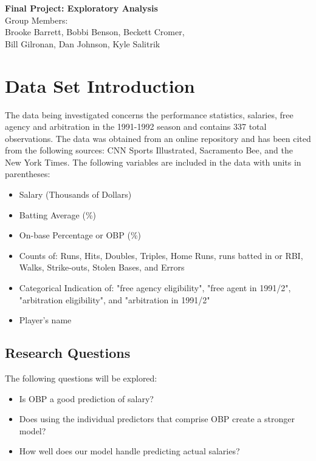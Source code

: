 \documentclass[a4paper, 11pt]{article}
\begin{document}
\graphicspath{{./figures/}}
\noindent
\large\textbf{Final Project: Exploratory Analysis} \\
\normalsize Group Members:\\ 
Brooke Barrett, Bobbi Benson, Beckett Cromer, \\
Bill Gilronan, Dan Johnson, Kyle Salitrik \hfill
\vspace{-1em}

\section*{Data Set Introduction}
The data being investigated concerns the performance statistics, salaries, free agency and arbitration in the 1991-1992 season and contains 337 total observations. The data was obtained from an online repository and has been cited from the following sources: CNN Sports Illustrated, Sacramento Bee, and the New York Times. The following variables are included in the data with units in parentheses:
\begin{itemize}
	\setlength\itemsep{0em}
	\item Salary (Thousands of Dollars)
	\item Batting Average (\%)
	\item On-base Percentage or OBP (\%)
	\item Counts of: Runs, Hits, Doubles, Triples, Home Runs, runs batted in or RBI, Walks, Strike-outs, Stolen Bases, and Errors
	\item Categorical Indication of: "free agency eligibility", "free agent in 1991/2", "arbitration eligibility", and "arbitration in 1991/2"
	\item Player's name
\end{itemize}
\vspace{-1em}
\subsection*{Research Questions}
The following questions will be explored:
\begin{itemize}
	\setlength\itemsep{0em}
	\item Is OBP a good prediction of salary?
	\item Does using the individual predictors that comprise OBP create a stronger model?
	\item How well does our model handle predicting actual salaries?
\end{itemize}
\end{document}
